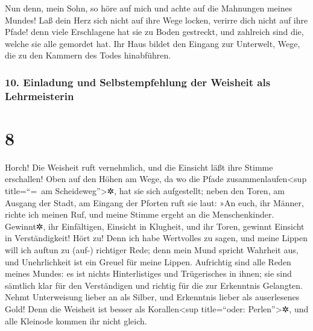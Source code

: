 Nun denn, mein Sohn, so höre auf mich und achte auf die
Mahnungen meines Mundes! Laß dein Herz sich nicht auf
ihre Wege locken, verirre dich nicht auf ihre Pfade! denn
viele Erschlagene hat sie zu Boden gestreckt, und zahlreich sind die,
welche sie alle gemordet hat. Ihr Haus bildet den Eingang
zur Unterwelt, Wege, die zu den Kammern des Todes hinabführen.

\hypertarget{einladung-und-selbstempfehlung-der-weisheit-als-lehrmeisterin}{%
\subsubsection{10. Einladung und Selbstempfehlung der Weisheit als
Lehrmeisterin}\label{einladung-und-selbstempfehlung-der-weisheit-als-lehrmeisterin}}

\hypertarget{section-7}{%
\section{8}\label{section-7}}

Horch! Die Weisheit ruft vernehmlich, und die Einsicht
läßt ihre Stimme erschallen! Oben auf den Höhen am Wege,
da wo die Pfade zusammenlaufen\textless sup title=``=~am
Scheideweg''\textgreater✲, hat sie sich aufgestellt; neben
den Toren, am Ausgang der Stadt, am Eingang der Pforten ruft sie laut:
»An euch, ihr Männer, richte ich meinen Ruf, und meine
Stimme ergeht an die Menschenkinder. Gewinnt✲, ihr
Einfältigen, Einsicht in Klugheit, und ihr Toren, gewinnt Einsicht in
Verständigkeit! Hört zu! Denn ich habe Wertvolles zu
sagen, und meine Lippen will ich auftun zu (auf-) richtiger Rede;
denn mein Mund spricht Wahrheit aus, und Unehrlichkeit ist
ein Greuel für meine Lippen. Aufrichtig sind alle Reden
meines Mundes: es ist nichts Hinterlistiges und Trügerisches in ihnen;
sie sind sämtlich klar für den Verständigen und richtig
für die zur Erkenntnis Gelangten. Nehmt Unterweisung
lieber an als Silber, und Erkenntnis lieber als auserlesenes Gold!
Denn die Weisheit ist besser als Korallen\textless sup
title=``oder: Perlen''\textgreater✲, und alle Kleinode kommen ihr nicht
gleich.

